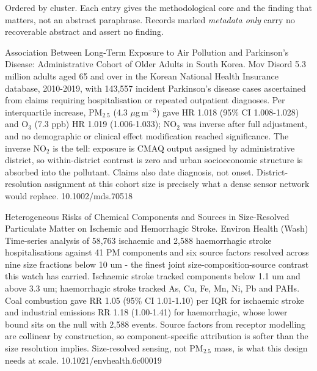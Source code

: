 \documentclass[10pt]{article}
\begin{document}
{\fontsize{7.4}{9}\selectfont\color{Slate}Ordered by cluster. Each entry gives the
methodological core and the finding that matters, not an abstract paraphrase. Records
marked \textit{metadata only} carry no recoverable abstract and assert no finding.\par}


{Association Between Long-Term Exposure to Air Pollution and Parkinson's Disease: Administrative Cohort of Older Adults in South Korea.}
{Mov Disord}
{5.3 million adults aged 65 and over in the Korean National Health Insurance database, 2010-2019, with 143,557 incident Parkinson's disease cases ascertained from claims requiring hospitalisation or repeated outpatient diagnoses. Per interquartile increase, PM$_{2.5}$ (4.3 $\mu$g\,m$^{-3}$) gave HR 1.018 (95\% CI 1.008-1.028) and O$_3$ (7.3 ppb) HR 1.019 (1.006-1.033); NO$_2$ was inverse after full adjustment, and no demographic or clinical effect modification reached significance. The inverse NO$_2$ is the tell: exposure is CMAQ output assigned by administrative district, so within-district contrast is zero and urban socioeconomic structure is absorbed into the pollutant. Claims also date diagnosis, not onset. District-resolution assignment at this cohort size is precisely what a dense sensor network would replace.}
{10.1002/mds.70518}


{Heterogeneous Risks of Chemical Components and Sources in Size-Resolved Particulate Matter on Ischemic and Hemorrhagic Stroke.}
{Environ Health (Wash)}
{Time-series analysis of 58,763 ischaemic and 2,588 haemorrhagic stroke hospitalisations against 41 PM components and six source factors resolved across nine size fractions below 10 um - the finest joint size-composition-source contrast this watch has carried. Ischaemic stroke tracked components below 1.1 um and above 3.3 um; haemorrhagic stroke tracked As, Cu, Fe, Mn, Ni, Pb and PAHs. Coal combustion gave RR 1.05 (95\% CI 1.01-1.10) per IQR for ischaemic stroke and industrial emissions RR 1.18 (1.00-1.41) for haemorrhagic, whose lower bound sits on the null with 2,588 events. Source factors from receptor modelling are collinear by construction, so component-specific attribution is softer than the size resolution implies. Size-resolved sensing, not PM$_{2.5}$ mass, is what this design needs at scale.}
{10.1021/envhealth.6c00019}
\end{document}
